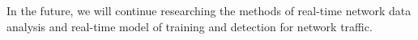 \documentclass[journal]{IEEEtran}
\begin{document}
In the future, we will continue researching the methods of real-time network data analysis and real-time model of training and detection for network traffic.
%
%



%
%
\end{document}
